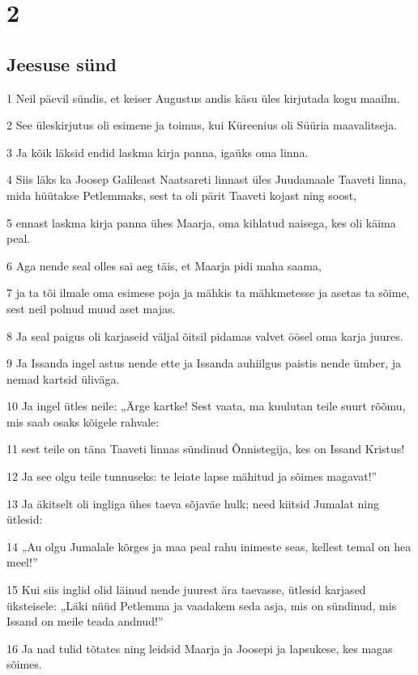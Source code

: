 \chapter{2}

\section*{Jeesuse sünd}

\par 1 Neil päevil sündis, et keiser Augustus andis käsu üles kirjutada kogu maailm.
\par 2 See üleskirjutus oli esimene ja toimus, kui Küreenius oli Süüria maavalitseja.
\par 3 Ja kõik läksid endid laskma kirja panna, igaüks oma linna.
\par 4 Siis läks ka Joosep Galileast Naatsareti linnast üles Juudamaale Taaveti linna, mida hüütakse Petlemmaks, sest ta oli pärit Taaveti kojast ning soost,
\par 5 ennast laskma kirja panna ühes Maarja, oma kihlatud naisega, kes oli käima peal.
\par 6 Aga nende seal olles sai aeg täis, et Maarja pidi maha saama,
\par 7 ja ta tõi ilmale oma esimese poja ja mähkis ta mähkmetesse ja asetas ta sõime, sest neil polnud muud aset majas.
\par 8 Ja seal paigus oli karjaseid väljal õitsil pidamas valvet öösel oma karja juures.
\par 9 Ja Issanda ingel astus nende ette ja Issanda auhiilgus paistis nende ümber, ja nemad kartsid üliväga.
\par 10 Ja ingel ütles neile: „Ärge kartke! Sest vaata, ma kuulutan teile suurt rõõmu, mis saab osaks kõigele rahvale:
\par 11 sest teile on täna Taaveti linnas sündinud Õnnistegija, kes on Issand Kristus!
\par 12 Ja see olgu teile tunnuseks: te leiate lapse mähitud ja sõimes magavat!”
\par 13 Ja äkitselt oli ingliga ühes taeva sõjaväe hulk; need kiitsid Jumalat ning ütlesid:
\par 14 „Au olgu Jumalale kõrges ja maa peal rahu inimeste seas, kellest temal on hea meel!”
\par 15 Kui siis inglid olid läinud nende juurest ära taevasse, ütlesid karjased üksteisele: „Läki nüüd Petlemma ja vaadakem seda asja, mis on sündinud, mis Issand on meile teada andnud!”
\par 16 Ja nad tulid tõtates ning leidsid Maarja ja Joosepi ja lapsukese, kes magas sõimes.
